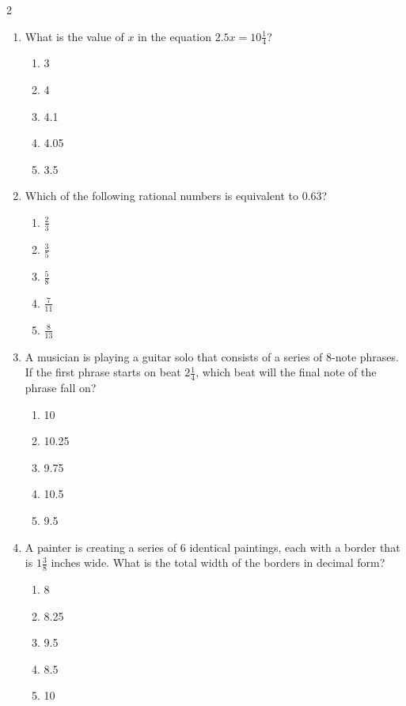 \documentclass[10pt]{article}
\begin{document}
\begin{multicols}{2}
\begin{enumerate}[label=\textbf{Q\arabic*.}, leftmargin=*, itemsep=6pt, parsep=0pt]
  \item \small What is the value of $x$ in the equation $2.5x = 10 \frac{1}{4}$?
  \begin{enumerate}[label=(\Alph*), leftmargin=0.6cm, nosep, itemsep=2pt]
    \item 3
    \item 4
    \item 4.1
    \item 4.05
    \item 3.5
  \end{enumerate}

  \item \small Which of the following rational numbers is equivalent to $0.6 \overline{3}$?
  \begin{enumerate}[label=(\Alph*), leftmargin=0.6cm, nosep, itemsep=2pt]
    \item $\frac{2}{3}$
    \item $\frac{3}{5}$
    \item $\frac{5}{8}$
    \item $\frac{7}{11}$
    \item $\frac{8}{13}$
  \end{enumerate}

  \item \small A musician is playing a guitar solo that consists of a series of $8$-note phrases. If the first phrase starts on beat $2 \frac{1}{4}$, which beat will the final note of the phrase fall on?
  \begin{enumerate}[label=(\Alph*), leftmargin=0.6cm, nosep, itemsep=2pt]
    \item 10
    \item 10.25
    \item 9.75
    \item 10.5
    \item 9.5
  \end{enumerate}

  \item \small A painter is creating a series of $6$ identical paintings, each with a border that is $1 \frac{3}{8}$ inches wide. What is the total width of the borders in decimal form?
  \begin{enumerate}[label=(\Alph*), leftmargin=0.6cm, nosep, itemsep=2pt]
    \item 8
    \item 8.25
    \item 9.5
    \item 8.5
    \item 10
  \end{enumerate}


\end{enumerate}
\end{multicols}
\end{document}
